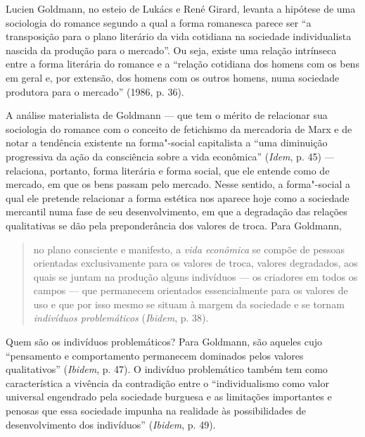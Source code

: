 Lucien Goldmann, no esteio de Lukács e René Girard, levanta a hipótese
de uma sociologia do romance segundo a qual a forma romanesca parece ser
``a transposição para o plano literário da vida cotidiana na sociedade
individualista nascida da produção para o mercado''. Ou seja, existe uma
relação intrínseca entre a forma literária do romance e a ``relação
cotidiana dos homens com os bens em geral e, por extensão, dos homens
com os outros homens, numa sociedade produtora para o mercado'' (1986, p. 36).

A análise materialista de Goldmann --- que tem o mérito de relacionar sua
sociologia do romance com o conceito de fetichismo da mercadoria de Marx
e de notar a tendência existente na forma"-social capitalista a ``uma
diminuição progressiva da ação da consciência sobre a vida econômica''
(\emph{Idem}, p. 45) --- relaciona, portanto, forma literária e forma
social, que ele entende como de mercado, em que os bens passam pelo
mercado. Nesse sentido, a forma"-social a qual ele pretende relacionar a
forma estética nos aparece hoje como a sociedade mercantil numa fase de
seu desenvolvimento, em que a degradação das relações qualitativas se
dão pela preponderância dos valores de troca. Para Goldmann,

\begin{quote}
no plano consciente e manifesto, a \emph{vida econômica} se compõe de
pessoas orientadas exclusivamente para os valores de troca, valores
degradados, aos quais se juntam na produção alguns indivíduos --- os
criadores em todos os campos --- que permanecem orientados essencialmente
para os valores de uso e que por isso mesmo se situam à margem da
sociedade e se tornam \emph{indivíduos problemáticos} (\emph{Ibidem}, p. 38).
\end{quote}

Quem são os indivíduos problemáticos? Para Goldmann, são aqueles cujo
``pensamento e comportamento permanecem dominados pelos valores
qualitativos'' (\emph{Ibidem}, p. 47). O indivíduo problemático também
tem como característica a vivência da contradição entre o
``individualismo como valor universal engendrado pela sociedade burguesa
e as limitações importantes e penosas que essa sociedade impunha na
realidade às possibilidades de desenvolvimento dos indivíduos''
(\emph{Ibidem}, p. 49).

